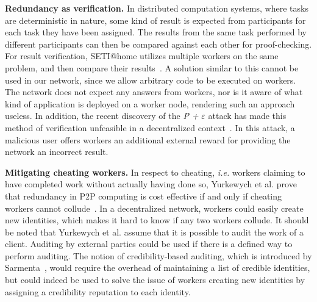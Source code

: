 \textbf{Redundancy as verification.} In distributed computation systems, where tasks are deterministic in nature, some kind of result is expected from participants for each task they have been assigned. The results from the same task performed by different participants can then be compared against each other for proof-checking. For result verification, SETI@home utilizes multiple workers on the same problem, and then compare their results~\cite{korpela:2001}. A solution similar to this cannot be used in our network, since we allow arbitrary code to be executed on workers. The network does not expect any answers from workers, nor is it aware of what kind of application is deployed on a worker node, rendering such an approach useless. In addition, the recent discovery of the \emph{P +} $\varepsilon$ attack has made this method of verification unfeasible in a decentralized context~\cite{buterin:2015}. In this attack, a malicious user offers workers an additional external reward for providing the network an incorrect result.

\textbf{Mitigating cheating workers.}
In respect to cheating, \textit{i.e.} workers claiming to have completed work without actually having done so, Yurkewych et al. prove that redundancy in P2P computing is cost effective if and only if cheating workers cannot collude~\cite{yurkewych:2005}. In a decentralized network, workers could easily create new identities, which makes it hard to know if any two workers collude. It should be noted that Yurkewych et al. assume that it is possible to audit the work of a client. Auditing by external parties could be used if there is a defined way to perform auditing. The notion of credibility-based auditing, which is introduced by Sarmenta~\cite{sarmenta:2002}, would require the overhead of maintaining a list of credible identities, but could indeed be used to solve the issue of workers creating new identities by assigning a credibility reputation to each identity.

